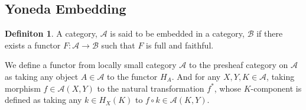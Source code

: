 \documentclass[18pt,a4paper]{article}
\theoremstyle{definition}
\newtheorem{definition}[theorem]{Definiton}
\begin{document}
\subsection{Yoneda Embedding}%
\begin{definition} %
	A category, $\mathcal{A}$  is said to be embedded in a category, $\mathcal{B}$ if there exists a
	functor $F: \mathcal{A} \to \mathcal{B} $ such that $F$ is full and faithful.
\end{definition} %

We define a functor from locally small category $\mathcal{A}$ to the presheaf category on
$\mathcal{A} $ as taking any object $A \in \mathcal{A} $ to the functor $H_A$.
And for any $X,Y,K \in \mathcal{A}$, taking morphism $f\in \mathcal{A} (X,Y)$
to the natural transformation $f^*$, whose $K$-component is defined as taking any $k \in H_X(K)$
to $f \circ k \in \mathcal{A} (K,Y)$.
\end{document}
